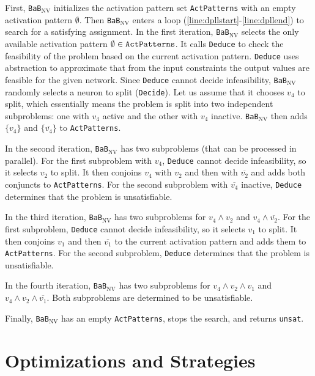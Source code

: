 \documentclass[oneside,11pt,dvipsnames]{book}
\newcommand{\functiontextformat}[1]{\textrm{\texttt{#1}}}
\newcommand{\bab}{\texttt{BaB$_{\text{NV}}$}}
\begin{document}
First, \bab{} initializes the activation pattern set \functiontextformat{ActPatterns} with an empty activation pattern $\emptyset$. Then \bab{} enters a loop (\autoref{line:dpllstart}-\autoref{line:dpllend}) to search for a satisfying assignment. In the first iteration, \bab{} selects the only available activation pattern $\emptyset \in \functiontextformat{ActPatterns}$. 
It calls \functiontextformat{Deduce} to check the feasibility of the problem based on the current activation pattern. \functiontextformat{Deduce} uses abstraction to approximate that from the input constraints the output values are feasible for the given network. 
Since \functiontextformat{Deduce} cannot decide infeasibility, \bab{} randomly selects a neuron to split (\functiontextformat{Decide}). Let us assume that it chooses $v_4$ to split, which essentially means the problem is split into two independent subproblems: one with $v_4$ active and the other with $v_4$ inactive.
\bab{} then adds $\{v_4\}$ and $\{\overline{v_4}\}$ to \functiontextformat{ActPatterns}.

In the second iteration, \bab{} has two subproblems (that can be processed in parallel). For the first subproblem with $v_4$, \functiontextformat{Deduce} cannot decide infeasibility, so it selects $v_2$ to split. It then conjoins $v_4$ with $v_2$ and then with $\overline{v_2}$ and adds both conjuncts to \texttt{ActPatterns}. 
For the second subproblem with $\overline{v_4}$ inactive, \functiontextformat{Deduce} determines that the problem is unsatisfiable.

In the third iteration, \bab{} has two subproblems for $v_4 \land v_2$ and $v_4 \land \overline{v_2}$. For the first subproblem, \functiontextformat{Deduce} cannot decide infeasibility, so it selects $v_1$ to split. It then conjoins $v_1$ and then $\overline{v_1}$ to the current activation pattern and adds them to \functiontextformat{ActPatterns}. For the second subproblem, \functiontextformat{Deduce} determines that the problem is unsatisfiable.

In the fourth iteration, \bab{} has two subproblems for $v_4 \land v_2 \land v_1$ and $v_4 \land v_2 \land \overline{v_1}$. Both subproblems are determined to be unsatisfiable.

Finally, \bab{} has an empty \texttt{ActPatterns}, stops the search, and returns \texttt{unsat}.




\part{Optimizations and Strategies}
\end{document}
